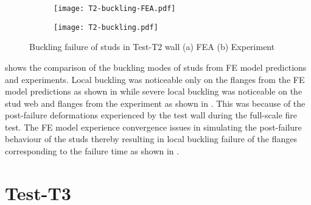\begin{figure}[!htbp]
	\centering
	\begin{subfigure}[b]{0.85\textwidth}
		\centering
		\texttt{[image: T2-buckling-FEA.pdf]}
		\caption{}
		\label{subfig:T2-buckling-FEA}
	\end{subfigure}
	\begin{subfigure}[b]{0.55\textwidth}
		\centering
		\texttt{[image: T2-buckling.pdf]}
		\caption{}
		\label{subfig:T2-buckling-FEA-Exp}
	\end{subfigure}
	   \caption{Buckling failure of studs in Test-T2 wall (a) FEA (b) Experiment}
	   \label{fig:T2-buckling-FE-vs-Exp}
\end{figure} 

 shows the comparison of the buckling modes of studs from FE model predictions and experiments. Local buckling was noticeable only on the flanges from the FE model predictions as shown in  while severe local buckling was noticeable on the stud web and flanges from the experiment as shown in . This was because of the post-failure deformations experienced by the test wall during the full-scale fire test. The FE model experience convergence issues in simulating the post-failure behaviour of the studs thereby resulting in local buckling failure of the flanges corresponding to the failure time as shown in .

\section*{Test-T3}

